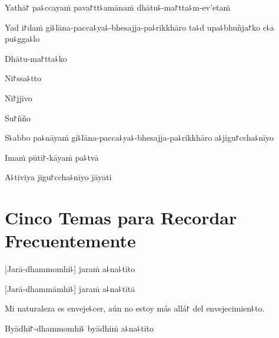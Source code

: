 
Yathā꜓ pa꜕ccayaṁ pava꜓tt꜕amānaṁ dhātu꜕-ma꜓tta꜕m-ev'etaṁ


Yad i꜓daṁ gi꜕lāna-pacca꜕ya꜕-bhesajja-pa꜕rikkhāro ta꜕d upa꜕bhuñja꜓ko c꜕a pu꜕gga꜕lo


Dhātu-ma꜓tta꜕ko


Ni꜓ssa꜕tto


Ni꜓jjīvo


Su꜓ñño


S꜕abbo pa꜕nāyaṁ gi꜕lāna-pacca꜕ya꜕-bhesajja-pa꜕rikkhāro a꜕jigu꜓ccha꜕nīyo


Imaṁ pūti꜓-kāyaṁ pa꜕tvā


A꜕tiviya jigu꜓ccha꜕nīyo jāyati


\clearpage



\chapter[Cinco Temas]{Cinco Temas para Recordar Frecuentemente}


\begin{leader}
\end{leader}

%
[Jarā-dhammomhi꜕] jaraṁ a꜕na꜕tīto

%
[Jarā-dhammāmhi꜕] jaraṁ a꜕na꜕tītā

\begin{english}
  Mi naturaleza es enveje꜕cer, aún no estoy más allá꜓ del envejecimien꜕to.
\end{english}

%
Byādhi꜓-dhammomhi꜕ byādhiṁ a꜕na꜕tīto

